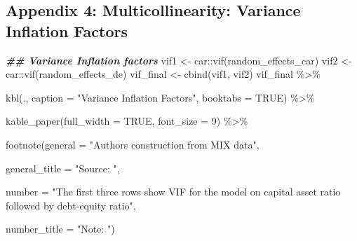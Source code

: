 \documentclass[a4paper,nobind]{templates/ociamthesis}
\newenvironment{Shaded}{\begin{snugshade}}{\end{snugshade}}
\newcommand{\AttributeTok}[1]{\textcolor[rgb]{0.77,0.63,0.00}{#1}}
\newcommand{\ConstantTok}[1]{\textcolor[rgb]{0.00,0.00,0.00}{#1}}
\newcommand{\DecValTok}[1]{\textcolor[rgb]{0.00,0.00,0.81}{#1}}
\newcommand{\DocumentationTok}[1]{\textcolor[rgb]{0.56,0.35,0.01}{\textbf{\textit{#1}}}}
\newcommand{\FunctionTok}[1]{\textcolor[rgb]{0.00,0.00,0.00}{#1}}
\newcommand{\NormalTok}[1]{#1}
\newcommand{\OtherTok}[1]{\textcolor[rgb]{0.56,0.35,0.01}{#1}}
\newcommand{\SpecialCharTok}[1]{\textcolor[rgb]{0.00,0.00,0.00}{#1}}
\newcommand{\StringTok}[1]{\textcolor[rgb]{0.31,0.60,0.02}{#1}}
\renewenvironment{Shaded}
{
  \vspace{10pt}%
  \begin{snugshade}%
}{%
  \end{snugshade}%
  \vspace{8pt}%
}
\begin{document}
\newpage

\begin{landscape}

\hypertarget{appendix-4-multicollinearity-variance-inflation-factors}{%
\subsection{Appendix 4: Multicollinearity: Variance Inflation Factors}\label{appendix-4-multicollinearity-variance-inflation-factors}}

\begin{Shaded}
\begin{Highlighting}[]
\DocumentationTok{\#\# Variance Inflation factors}
\NormalTok{vif1 }\OtherTok{\textless{}{-}}\NormalTok{ car}\SpecialCharTok{::}\FunctionTok{vif}\NormalTok{(random\_effects\_car)}
\NormalTok{vif2 }\OtherTok{\textless{}{-}}\NormalTok{ car}\SpecialCharTok{::}\FunctionTok{vif}\NormalTok{(random\_effects\_de)}
\NormalTok{vif\_final }\OtherTok{\textless{}{-}} \FunctionTok{cbind}\NormalTok{(vif1, vif2)}
\NormalTok{vif\_final }\SpecialCharTok{\%\textgreater{}\%} 
  
  \FunctionTok{kbl}\NormalTok{(., }\AttributeTok{caption =} \StringTok{"Variance Inflation Factors"}\NormalTok{, }\AttributeTok{booktabs =} \ConstantTok{TRUE}\NormalTok{) }\SpecialCharTok{\%\textgreater{}\%} 
  
  \FunctionTok{kable\_paper}\NormalTok{(}\AttributeTok{full\_width =} \ConstantTok{TRUE}\NormalTok{, }\AttributeTok{font\_size =} \DecValTok{9}\NormalTok{) }\SpecialCharTok{\%\textgreater{}\%} 
  
  \FunctionTok{footnote}\NormalTok{(}\AttributeTok{general =} \StringTok{"Authors\textquotesingle{} construction from MIX data"}\NormalTok{,}
           
           \AttributeTok{general\_title =} \StringTok{"Source: "}\NormalTok{, }
           
           \AttributeTok{number =} \StringTok{"The first three rows show VIF for the model on capital asset ratio followed by debt{-}equity ratio"}\NormalTok{,}
           
           \AttributeTok{number\_title =} \StringTok{"Note: "}\NormalTok{)}
\end{Highlighting}
\end{Shaded}

\begin{table}


\end{table}
\end{landscape}
\end{document}
